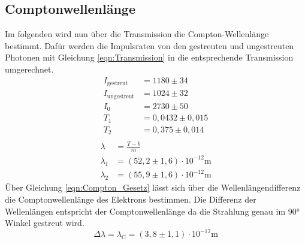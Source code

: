 \subsection{Comptonwellenlänge}
Im folgenden wird nun über die Transmission die Compton-Wellenlänge bestimmt.
Dafür werden die Impulsraten von den gestreuten und ungestreuten Photonen mit Gleichung \ref{eqn:Transmission} in die entsprechende Transmission umgerechnet.
\begin{align*}
    I_{\text{gestreut}} &= 1180 \pm 34  \\ 
    I_{\text{ungestreut}} &= 1024 \pm 32  \\
    I_0 &= 2730 \pm 50 \\
    T_1 &= 0,0432 \pm 0,015 \\
    T_2 &= 0,375 \pm 0,014 \\ 
\end{align*}
\begin{align*}
    \lambda &= \frac{T-b}{m} \\
    \lambda_{1} &=  (52,2 \pm 1,6) \cdot 10^{-12} \text{m}\\
    \lambda_{2} &=  (55,9 \pm 1,6) \cdot 10^{-12} \text{m}
\end{align*}
Über Gleichung \ref{eqn:Compton_Gesetz} lässt sich über die Wellenlängendifferenz die Comptonwellenlänge des Elektrons bestimmen.
Die Differenz der Wellenlängen entspricht der Comptonwellenlänge da die Strahlung genau im 90° Winkel gestreut wird.
\begin{equation}
    \Delta\lambda = \lambda_{\text{C}} = (3,8\pm 1,1)\cdot 10^{-12} \text{m}
\end{equation}

